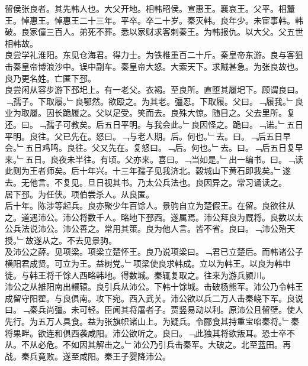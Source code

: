 \documentclass{zhvt-classic}
\begin{document}
\hspace*{2em}留侯张良者。其先韩人也。大父开地。相韩昭侯。宣惠王。襄哀王。父平。相釐王。悼惠王。悼惠王二十三年。平卒。卒二十岁。秦灭韩。良年少。未宦事韩。韩破。良家僮三百人。弟死不葬。悉以家财求客刺秦王。为韩报仇。以大父。父五世相韩故。\\
\hspace*{2em}良尝学礼淮阳。东见仓海君。得力士。为铁椎重百二十斤。秦皇帝东游。良与客狙击秦皇帝博浪沙中。误中副车。秦皇帝大怒。大索天下。求贼甚急。为张良故也。良乃更名姓。亡匿下邳。\\
\hspace*{2em}良尝闲从容步游下邳圯上。有一老父。衣褐。至良所。直堕其履圯下。顾谓良曰。﹁孺子。下取履。﹂良鄂然。欲殴之。为其老。彊忍。下取履。父曰。﹁履我。﹂良业为取履。因长跪履之。父以足受。笑而去。良殊大惊。随目之。父去里所。复还。曰。﹁孺子可教矣。后五日平明。与我会此。﹂良因怪之。跪曰。﹁诺。﹂五日平明。良往。父已先在。怒曰。﹁与老人期。后。何也。﹂去。曰。﹁后五日早会。﹂五日鸡鸣。良往。父又先在。复怒曰。﹁后。何也。﹂去。曰。﹁后五日复早来。﹂五日。良夜未半往。有顷。父亦来。喜曰。﹁当如是。﹂出一编书。曰。﹁读此则为王者师矣。后十年兴。十三年孺子见我济北。穀城山下黄石即我矣。﹂遂去。无他言。不复见。旦日视其书。乃太公兵法也。良因异之。常习诵读之。\\
\hspace*{2em}居下邳。为任侠。项伯尝杀人。从良匿。\\
\hspace*{2em}后十年。陈涉等起兵。良亦聚少年百馀人。景驹自立为楚假王。在留。良欲往从之。道遇沛公。沛公将数千人。略地下邳西。遂属焉。沛公拜良为厩将。良数以太公兵法说沛公。沛公善之。常用其策。良为他人言。皆不省。良曰。﹁沛公殆天授。﹂故遂从之。不去见景驹。\\
\hspace*{2em}及沛公之薛。见项梁。项梁立楚怀王。良乃说项梁曰。﹁君已立楚后。而韩诸公子横阳君成贤。可立为王。益树党。﹂项梁使良求韩成。立以为韩王。以良为韩申徒。与韩王将千馀人西略韩地。得数城。秦辄复取之。往来为游兵颍川。\\
\hspace*{2em}沛公之从雒阳南出轘辕。良引兵从沛公。下韩十馀城。击破杨熊军。沛公乃令韩王成留守阳翟。与良俱南。攻下宛。西入武关。沛公欲以兵二万人击秦峣下军。良说曰。﹁秦兵尚彊。未可轻。臣闻其将屠者子。贾竖易动以利。原沛公且留壁。使人先行。为五万人具食。益为张旗帜诸山上。为疑兵。令郦食其持重宝啗秦将。﹂秦将果畔。欲连和俱西袭咸阳。沛公欲听之。良曰。﹁此独其将欲叛耳。恐士卒不从。不从必危。不如因其解击之。﹂沛公乃引兵击秦军。大破之。北至蓝田。再战。秦兵竟败。遂至咸阳。秦王子婴降沛公。\\
\end{document}
